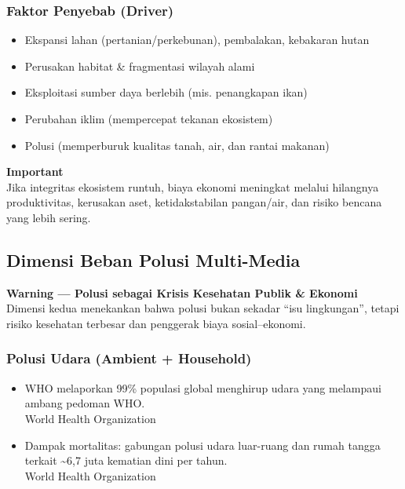\documentclass[
  letterpaper,
  DIV=11,
  numbers=noendperiod]{scrreprt}
\providecommand{\tightlist}{%
  \setlength{\itemsep}{0pt}\setlength{\parskip}{0pt}}
\begin{document}
\subsubsection{Faktor Penyebab (Driver)}\label{faktor-penyebab-driver}

\begin{itemize}
\tightlist
\item
  Ekspansi lahan (pertanian/perkebunan), pembalakan, kebakaran hutan
\item
  Perusakan habitat \& fragmentasi wilayah alami
\item
  Eksploitasi sumber daya berlebih (mis. penangkapan ikan)
\item
  Perubahan iklim (mempercepat tekanan ekosistem)
\item
  Polusi (memperburuk kualitas tanah, air, dan rantai makanan)
\end{itemize}

\textbf{Important}\\
Jika integritas ekosistem runtuh, biaya ekonomi meningkat melalui
hilangnya produktivitas, kerusakan aset, ketidakstabilan pangan/air, dan
risiko bencana yang lebih sering.

\subsection{Dimensi Beban Polusi
Multi-Media}\label{dimensi-beban-polusi-multi-media}

\textbf{Warning --- Polusi sebagai Krisis Kesehatan Publik \& Ekonomi}\\
Dimensi kedua menekankan bahwa polusi bukan sekadar ``isu lingkungan'',
tetapi risiko kesehatan terbesar dan penggerak biaya sosial--ekonomi.

\subsubsection{Polusi Udara (Ambient +
Household)}\label{polusi-udara-ambient-household}

\begin{itemize}
\item
  WHO melaporkan 99\% populasi global menghirup udara yang melampaui
  ambang pedoman WHO.\\
  World Health Organization
\item
  Dampak mortalitas: gabungan polusi udara luar-ruang dan rumah tangga
  terkait \textasciitilde6,7 juta kematian dini per tahun.\\
  World Health Organization
\end{itemize}
\end{document}
